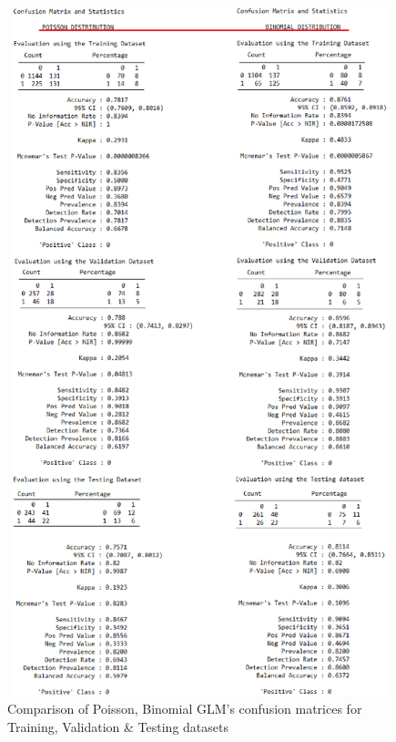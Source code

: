 \documentclass{DissertateUSU}
\begin{document}
\begin{figure}
\centering
\includegraphics[height=20cm, width=15cm]{ConfusionMatrix_Appendix.eps}
\caption[Confusion Matrices comparison]{Comparison of Poisson, Binomial GLM's confusion matrices for Training, Validation \& Testing datasets}
\label{ConfusionMatrixAll}
\end{figure}
\end{document}
